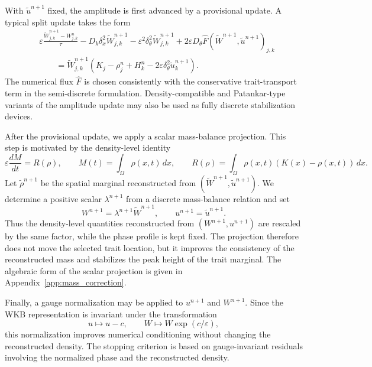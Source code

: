 \documentclass[11pt]{article}
\begin{document}
With \(\widetilde u^{n+1}\) fixed, the amplitude is first advanced by a
provisional update.  A typical split update takes the form
\begin{equation}
\begin{aligned}
    &\varepsilon\frac{\widetilde W_{j,k}^{n+1}-W_{j,k}^n}{\tau}
    -D_k\delta_x^2\widetilde W_{j,k}^{n+1}
    -\varepsilon^2\delta_\theta^2\widetilde W_{j,k}^{n+1}
    +2\varepsilon D_\theta\widehat F(\widetilde W^{n+1},
    \widetilde u^{n+1})_{j,k}
    \\
    &\qquad
    =
    \widetilde W_{j,k}^{n+1}
    \left(
    K_j-\rho_j^n+H_k^n-2\varepsilon\delta_\theta^2
    \widetilde u_k^{n+1}
    \right).
\end{aligned}
\label{eq:fully-discrete-W-provisional}
\end{equation}
The numerical flux \(\widehat F\) is chosen consistently with the conservative
trait-transport term in the semi-discrete formulation.  Density-compatible and
Patankar-type variants of the amplitude update may also be used as fully
discrete stabilization devices.

After the provisional update, we apply a scalar mass-balance projection.  This
step is motivated by the density-level identity
\[
    \varepsilon \frac{dM}{dt}
    =
    R(\rho),
    \qquad
    M(t)=\int_\Omega \rho(x,t)\,dx,
    \qquad
    R(\rho)=\int_\Omega \rho(x,t)(K(x)-\rho(x,t))\,dx .
\]
Let \(\widetilde\rho^{n+1}\) be the spatial marginal reconstructed from
\((\widetilde W^{n+1},\widetilde u^{n+1})\).  We determine a positive scalar
\(\lambda^{n+1}\) from a discrete mass-balance relation and set
\[
    W^{n+1}=\lambda^{n+1}\widetilde W^{n+1},
    \qquad
    u^{n+1}=\widetilde u^{n+1}.
\]
Thus the density-level quantities reconstructed from \((W^{n+1},u^{n+1})\)
are rescaled by the same factor, while the phase profile is kept fixed.  The
projection therefore does not move the selected trait location, but it improves
the consistency of the reconstructed mass and stabilizes the peak height of the
trait marginal.  The algebraic form of the scalar projection is given in
Appendix~\ref{app:mass_correction}.

Finally, a gauge normalization may be applied to \(u^{n+1}\) and \(W^{n+1}\).
Since the WKB representation is invariant under the transformation
\[
    u\mapsto u-c,
    \qquad
    W\mapsto W\exp(c/\varepsilon),
\]
this normalization improves numerical conditioning without changing the
reconstructed density.  The stopping criterion is based on gauge-invariant
residuals involving the normalized phase and the reconstructed density.
\end{document}
